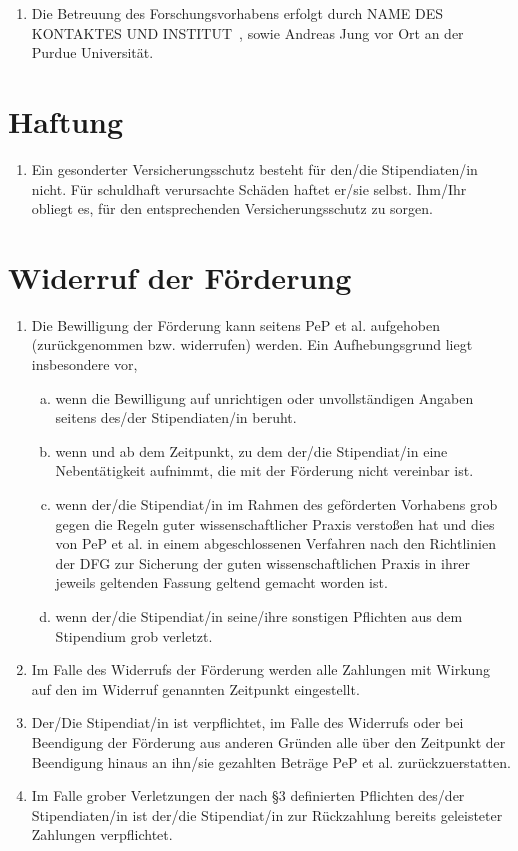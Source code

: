 \documentclass[
  paper=a4,
  fontsize=12pt,
  DIV=16,
  parskip=full,
  headinclude=true,
]{scrartcl}
\newcommand\stipbetreuung{NAME DES KONTAKTES UND INSTITUT}  %
\begin{document}
\begin{enumerate}[\qquad(1)]
  \item Die Betreuung des Forschungsvorhabens erfolgt durch \stipbetreuung\ ,
  sowie Andreas Jung vor Ort an der Purdue Universität.
\end{enumerate}

\section{Haftung}

\begin{enumerate}[\qquad(1)]
  \item Ein gesonderter Versicherungsschutz besteht für den/die
    Stipendiaten/in nicht.
    Für schuldhaft verursachte Schäden haftet er/sie selbst.
    Ihm/Ihr obliegt es, für den entsprechenden Versicherungsschutz
    zu sorgen.
\end{enumerate}

\section{Widerruf der Förderung}

\begin{enumerate}[\qquad(1)]
  \item Die Bewilligung der Förderung kann seitens PeP et al. aufgehoben
    (zurückgenommen bzw. widerrufen) werden. Ein Aufhebungsgrund
    liegt insbesondere vor,
    \begin{enumerate}[(a)]
      \item wenn die Bewilligung auf unrichtigen oder
        unvollständigen Angaben seitens des/der
        Stipendiaten/in beruht.
      \item wenn und ab dem Zeitpunkt, zu dem der/die Stipendiat/in
        eine Nebentätigkeit aufnimmt, die mit der Förderung
        nicht vereinbar ist.
      \item wenn der/die Stipendiat/in im Rahmen des geförderten
        Vorhabens grob gegen die Regeln guter wissenschaftlicher
        Praxis verstoßen hat und dies von PeP et al. in einem
        abgeschlossenen Verfahren nach den Richtlinien
        der DFG zur Sicherung der guten wissenschaftlichen
        Praxis in ihrer jeweils geltenden Fassung geltend
        gemacht worden ist.
      \item wenn der/die Stipendiat/in seine/ihre sonstigen Pflichten
        aus dem Stipendium grob verletzt.
    \end{enumerate}
  \item Im Falle des Widerrufs der Förderung werden alle Zahlungen mit Wirkung
    auf den im Widerruf genannten Zeitpunkt eingestellt.
  \item Der/Die Stipendiat/in ist verpflichtet, im Falle des Widerrufs oder
    bei Beendigung der Förderung aus anderen Gründen alle über den
    Zeitpunkt der Beendigung hinaus an ihn/sie gezahlten Beträge
    PeP et al. zurückzuerstatten.
  \item Im Falle grober Verletzungen der nach §3 definierten Pflichten
    des/der Stipendiaten/in ist der/die Stipendiat/in zur Rückzahlung
    bereits geleisteter Zahlungen verpflichtet.
\end{enumerate}
\end{document}
